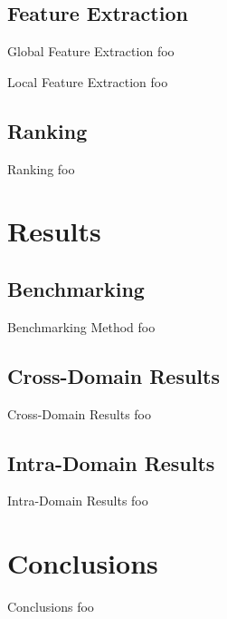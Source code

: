 \documentclass[mathserif]{beamer}
\begin{document}
\subsection{Feature Extraction}
\begin{frame}{Global Feature Extraction}
    foo
\end{frame}

\begin{frame}{Local Feature Extraction}
    foo
\end{frame}

\subsection{Ranking}
\begin{frame}{Ranking}
    foo
\end{frame}

\section{Results}
\subsection{Benchmarking}
\begin{frame}{Benchmarking Method}
    foo
\end{frame}

\subsection{Cross-Domain Results}
\begin{frame}{Cross-Domain Results}
    foo
\end{frame}

\subsection{Intra-Domain Results}
\begin{frame}{Intra-Domain Results}
    foo
\end{frame}

\section{Conclusions}
\begin{frame}{Conclusions}
    foo
\end{frame}

\end{document}
